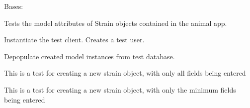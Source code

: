 \documentclass[letterpaper,10pt,english]{sphinxmanual}
\begin{document}
\begin{fulllineitems}
\label{api:mousedb.animal.tests.StrainModelTests}
Bases: 

Tests the model attributes of Strain objects contained in the animal app.

\begin{fulllineitems}
\label{api:mousedb.animal.tests.StrainModelTests.setUp}
Instantiate the test client.  Creates a test user.

\end{fulllineitems}


\begin{fulllineitems}
\label{api:mousedb.animal.tests.StrainModelTests.tearDown}
Depopulate created model instances from test database.

\end{fulllineitems}


\begin{fulllineitems}
\label{api:mousedb.animal.tests.StrainModelTests.test_create_strain_all}
This is a test for creating a new strain object, with only all fields being entered

\end{fulllineitems}


\begin{fulllineitems}
\label{api:mousedb.animal.tests.StrainModelTests.test_create_strain_minimal}
This is a test for creating a new strain object, with only the minimum fields being entered

\end{fulllineitems}



\end{fulllineitems}
\end{document}
